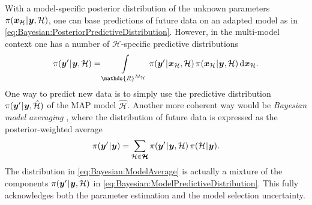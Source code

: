 \par %
With a model-specific posterior distribution of the unknown parameters \(\pi(\bm{x}_\mathcal{H} {\:\!}|{\:\!} \bm{y},\mathcal{H})\),
one can base predictions of future data on an adapted model as in \cref{eq:Bayesian:PosteriorPredictiveDistribution}.
However, in the multi-model context one has a number of \(\mathcal{H}\)-specific predictive distributions
\begin{equation} \label{eq:Bayesian:ModelPredictiveDistribution}
  \pi(\bm{y}^\prime \cond \bm{y},\mathcal{H})
  = \int\limits_{\mathds{R}^{\dimParam_\mathcal{H}}} \pi(\bm{y}^\prime \cond \bm{x}_\mathcal{H},\mathcal{H})
  \, \pi(\bm{x}_\mathcal{H} \cond \bm{y},\mathcal{H}) \, \mathrm{d} \bm{x}_\mathcal{H}.
\end{equation}
One way to predict new data is to simply use the predictive distribution \(\pi(\bm{y}^\prime {\:\!}|{\:\!} \bm{y},\hat{\mathcal{H}})\) of the MAP model \(\hat{\mathcal{H}}\).
Another more coherent way would be \emph{Bayesian model averaging} \cite{Bayesian:Raftery1997,Bayesian:Hoeting1999},
where the distribution of future data is expressed as the posterior-weighted average
\begin{equation} \label{eq:Bayesian:ModelAverage}
  \pi(\bm{y}^\prime {\:\!}|{\:\!} \bm{y}) = \sum\limits_{\mathcal{H} \in \bm{\mathcal{H}}} \pi(\bm{y}^\prime {\:\!}|{\:\!} \bm{y},\mathcal{H}) \, \pi(\mathcal{H} {\:\!}|{\:\!} \bm{y}).
\end{equation}
The distribution in \cref{eq:Bayesian:ModelAverage} is actually a mixture of the components \(\pi(\bm{y}^\prime {\:\!}|{\:\!} \bm{y},\mathcal{H})\) in \cref{eq:Bayesian:ModelPredictiveDistribution}.
This fully acknowledges both the parameter estimation and the model selection uncertainty.